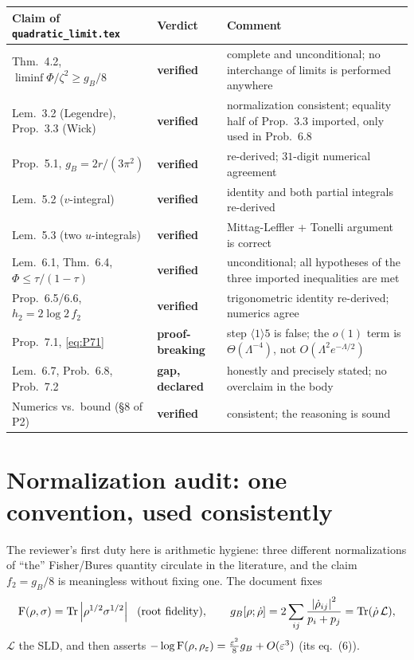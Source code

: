 \documentclass[11pt]{article}
\newcommand{\abs}[1]{\left|#1\right|}
\theoremstyle{definition}\newtheorem{problem}[theorem]{Problem}
\begin{document}
\begin{center}\small
\begin{tabular}{p{}p{}p{}}\toprule
\textbf{Claim of \texttt{quadratic\_limit.tex}} & \textbf{Verdict} & \textbf{Comment}\\\midrule
Thm.~4.2, \(\liminf\Phi/\zeta^2\ge g_B/8\) & \textbf{verified} & complete and unconditional; no
interchange of limits is performed anywhere\\
Lem.~3.2 (Legendre), Prop.~3.3 (Wick) & \textbf{verified} & normalization consistent; equality half
of Prop.~3.3 imported, only used in Prob.~6.8\\
Prop.~5.1, \(g_B=2r/(3\pi^2)\) & \textbf{verified} & re-derived; \(31\)-digit numerical agreement\\
Lem.~5.2 (\(v\)-integral) & \textbf{verified} & identity and both partial integrals re-derived\\
Lem.~5.3 (two \(u\)-integrals) & \textbf{verified} & Mittag-Leffler + Tonelli argument is correct\\
Lem.~6.1, Thm.~6.4, \(\Phi\le\tau/(1-\tau)\) & \textbf{verified} & unconditional; all hypotheses of
the three imported inequalities are met\\
Prop.~6.5/6.6, \(h_2=2\log2\,f_2\) & \textbf{verified} & trigonometric identity re-derived; numerics
agree\\
Prop.~7.1, \eqref{eq:P71} & \textbf{proof-breaking} & step \(\langle1\rangle5\) is false; the
\(o(1)\) term is \(\Theta(\Lambda^{-4})\), not \(O(\Lambda^2e^{-\Lambda/2})\)\\
Lem.~6.7, Prob.~6.8, Prob.~7.2 & \textbf{gap, declared} & honestly and precisely stated; no
overclaim in the body\\
Numerics vs.\ bound (\S8 of P2) & \textbf{verified} & consistent; the reasoning is sound\\
\bottomrule\end{tabular}
\end{center}

\section{Normalization audit: one convention, used consistently}\label{sec:norm}

The reviewer's first duty here is arithmetic hygiene: three different normalizations of ``the''
Fisher/Bures quantity circulate in the literature, and the claim \(f_2=g_B/8\) is meaningless
without fixing one.  The document fixes
\begin{equation}\label{eq:conv}
 \Fid(\rho,\sigma)=\Tr\abs{\rho^{1/2}\sigma^{1/2}}\ \ (\text{root fidelity}),\qquad
 g_B[\rho;\dot\rho]=2\sum_{ij}\frac{\abs{\dot\rho_{ij}}^2}{p_i+p_j}=\Tr(\dot\rho\,\mathcal L),
\end{equation}
\(\mathcal L\) the SLD, and then asserts
\(-\log\operatorname{F}(\rho,\rho_\varepsilon)=\frac{\varepsilon^2}{8}g_B+O(\varepsilon^3)\) (its eq.~(6)).
\end{document}
